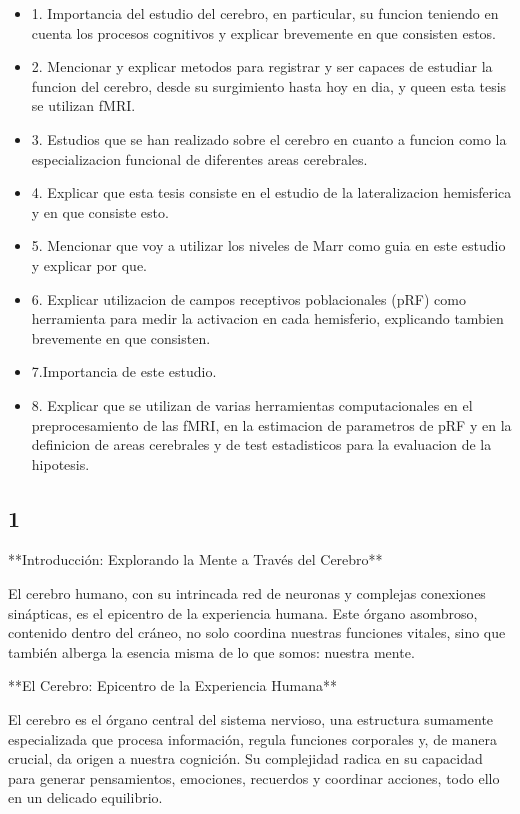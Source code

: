 \documentclass{article}
\begin{document}
	\begin{itemize}
		\item 1. Importancia del estudio del cerebro, en particular, su funcion teniendo en cuenta los procesos cognitivos y explicar brevemente en que consisten estos.
		\item 2. Mencionar y explicar metodos para registrar y ser capaces de estudiar la funcion del cerebro, desde su surgimiento hasta hoy en dia, y queen esta tesis se utilizan fMRI.
		\item 3. Estudios que se han realizado sobre el cerebro en cuanto a funcion como la especializacion funcional de diferentes areas cerebrales.
		\item 4. Explicar que esta tesis consiste en el estudio de la lateralizacion hemisferica y en que consiste esto.
		\item 5. Mencionar que voy a utilizar los niveles de Marr como guia en este estudio y explicar por que. 
		\item 6. Explicar utilizacion de campos receptivos poblacionales (pRF) como herramienta para medir la activacion en cada hemisferio, explicando tambien brevemente en que consisten. 
		\item 7.Importancia de este estudio.
		\item 8. Explicar que se utilizan de varias herramientas computacionales  en el preprocesamiento de las fMRI, en la estimacion de parametros de pRF y en la definicion de areas cerebrales y de test estadisticos para la evaluacion de la hipotesis.
	\end{itemize}
	
	\subsection{1}
	**Introducción: Explorando la Mente a Través del Cerebro**
	
	El cerebro humano, con su intrincada red de neuronas y complejas conexiones sinápticas, es el epicentro de la experiencia humana. Este órgano asombroso, contenido dentro del cráneo, no solo coordina nuestras funciones vitales, sino que también alberga la esencia misma de lo que somos: nuestra mente.
	
	**El Cerebro: Epicentro de la Experiencia Humana**
	
	El cerebro es el órgano central del sistema nervioso, una estructura sumamente especializada que procesa información, regula funciones corporales y, de manera crucial, da origen a nuestra cognición. Su complejidad radica en su capacidad para generar pensamientos, emociones, recuerdos y coordinar acciones, todo ello en un delicado equilibrio.
	
\end{document}
